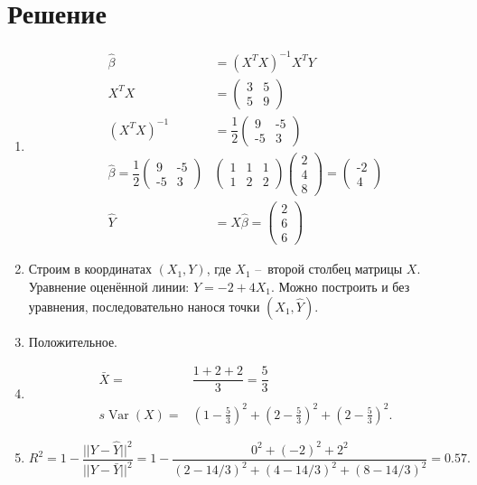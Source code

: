 \documentclass[11pt, a4paper]{extarticle}
\DeclareMathOperator{\Var}{Var}
\begin{document}
\section*{Решение}
\begin{enumerate}[label=\alph*)]
	\item
	\begin{align*}
		\hat{\beta} &= (X^TX)^{-1}X^TY \\
		X^TX &= \begin{pmatrix}
		3 & 5 \\
		5 & 9
		\end{pmatrix} \\
		(X^TX)^{-1} &= \dfrac{1}{2}\begin{pmatrix}
		9 & \text{-}5 \\
		\text{-}5 & 3
		\end{pmatrix} \\
		\hat{\beta} = \dfrac{1}{2}\begin{pmatrix}
		9 & \text{-}5 \\
		\text{-}5 & 3
		\end{pmatrix}&\begin{pmatrix}
		1 & 1 & 1 \\
		1 & 2 & 2
		\end{pmatrix}\begin{pmatrix}
		2 \\ 
		4 \\
		8
		\end{pmatrix} = \begin{pmatrix}
		\text{-}2 \\
		4
		\end{pmatrix} \\
		\hat{Y} &= X\hat{\beta} = \begin{pmatrix}
		2 \\
		6 \\
		6
		\end{pmatrix}
	\end{align*}
	\item Строим в координатах $(X_1, Y)$, где $X_1$ – второй столбец матрицы $X$. Уравнение оценённой линии: $\hat{Y} = -2 + 4X_1$. Можно построить и без уравнения, последовательно нанося точки $(X_1, \hat{Y})$. 
	\item Положительное. 
	\item 
	\begin{align*}
		\bar{X} =& \dfrac{1 + 2 + 2}{3} = \dfrac{5}{3} \\\\
		s\Var(X) =& (1 - \frac{5}{3})^2 + (2 - \frac{5}{3})^2 + (2 - \frac{5}{3})^2.
	\end{align*}
	
	\item $R^2 = 1 - \dfrac{||Y - \hat{Y}||^2}{||Y - \bar{Y}||^2} = 1 - \dfrac{0^2 + (-2)^2 + 2^2}{(2 - 14/3)^2 + (4 - 14/3)^2 + (8 - 14/3)^2} = 0.57.$
\end{enumerate}

	
\end{document}

